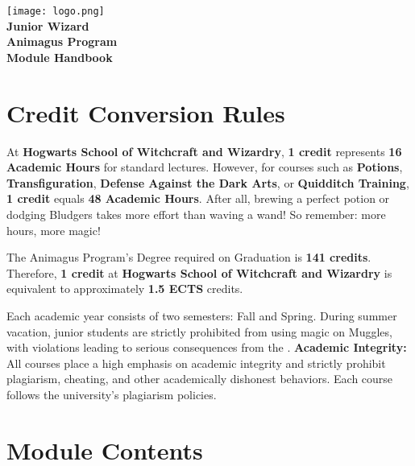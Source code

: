 \documentclass{report}
\begin{document}
\begin{titlepage}
    \centering
    \texttt{[image: logo.png]}\\[3cm] %
    {\LARGE\textbf{Junior Wizard}} \\[1cm] 
    {\LARGE\textbf{Animagus Program}} \\[1cm]   
    {\LARGE\textbf{Module Handbook}} \\[1.5cm]
    \vfill %
\end{titlepage}

\newpage 
\section*{Credit Conversion Rules}
\noindent
At \textbf{Hogwarts School of Witchcraft and Wizardry}, \textbf{1 credit} represents \textbf{16 Academic Hours} for standard lectures. However, for courses such as \textbf{Potions}, \textbf{Transfiguration}, \textbf{Defense Against the Dark Arts}, or \textbf{Quidditch Training}, \textbf{1 credit} equals \textbf{48 Academic Hours}. 
After all, brewing a perfect potion or dodging Bludgers takes more effort than waving a wand! So remember: more hours, more magic!

\medskip %
\noindent
The Animagus Program’s Degree required on Graduation is \textbf{141 credits}. Therefore, \textbf{1 credit} at \textbf{Hogwarts School of Witchcraft and Wizardry} is equivalent to approximately \textbf{1.5 ECTS} credits.

\medskip
\noindent
Each academic year consists of two semesters: Fall and Spring. During summer vacation, junior students are strictly prohibited from using magic on Muggles, with violations leading to serious consequences from the .
%
\medskip
\noindent
\textbf{Academic Integrity:} 
\\
All courses place a high emphasis on academic integrity and strictly prohibit plagiarism, cheating, and other academically dishonest behaviors. Each course follows the university's plagiarism policies.

\newpage
\section*{Module Contents}
\end{document}
